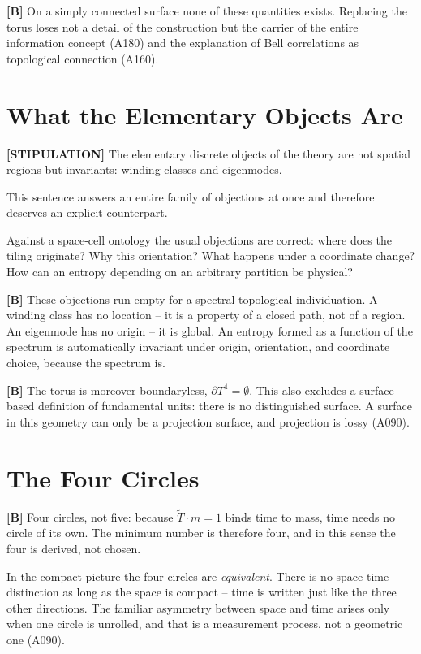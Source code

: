 \textbf{[B]} On a simply connected surface none of these quantities exists.
Replacing the torus loses not a detail of the construction but the carrier
of the entire information concept (A180) and the explanation of Bell
correlations as topological connection (A160).

\section{What the Elementary Objects Are}

\textbf{[STIPULATION]} The elementary discrete objects of the theory are not
spatial regions but invariants: winding classes and eigenmodes.

This sentence answers an entire family of objections at once and therefore
deserves an explicit counterpart.

Against a space-cell ontology the usual objections are correct: where does
the tiling originate? Why this orientation? What happens under a coordinate
change? How can an entropy depending on an arbitrary partition be physical?

\textbf{[B]} These objections run empty for a spectral-topological
individuation. A winding class has no location -- it is a property of a
closed path, not of a region. An eigenmode has no origin -- it is global.
An entropy formed as a function of the spectrum is automatically invariant
under origin, orientation, and coordinate choice, because the spectrum is.

\textbf{[B]} The torus is moreover boundaryless, $\partial T^4 = \emptyset$.
This also excludes a surface-based definition of fundamental units: there is
no distinguished surface. A surface in this geometry can only be a projection
surface, and projection is lossy (A090).

\section{The Four Circles}

\textbf{[B]} Four circles, not five: because $\tilde T\cdot m = 1$ binds
time to mass, time needs no circle of its own. The minimum number is therefore
four, and in this sense the four is derived, not chosen.

In the compact picture the four circles are \emph{equivalent}. There is no
space-time distinction as long as the space is compact -- time is written just
like the three other directions. The familiar asymmetry between space and time
arises only when one circle is unrolled, and that is a measurement process,
not a geometric one (A090).


